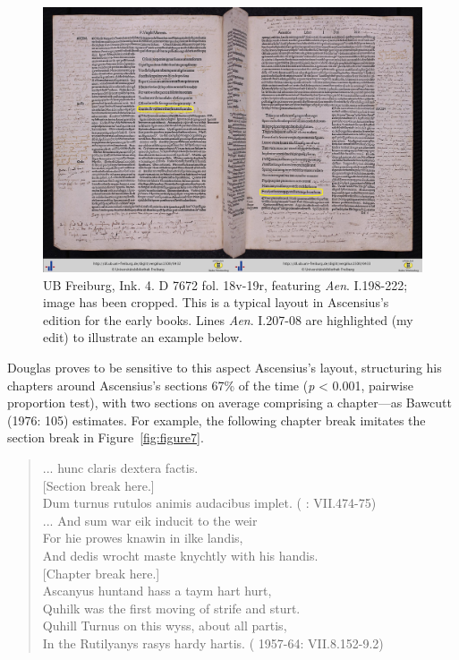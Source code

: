 \documentclass{dhbenelux}
\begin{document}
\begin{figure}[H]
\begin{center}
\includegraphics[width=1\linewidth]{Images/Figure6.jpg}
\end{center}
\caption{UB Freiburg, Ink. 4. D 7672 fol. 18v-19r, featuring \emph{Aen}. I.198-222; image has been cropped.  This is a typical layout in Ascensius’s edition for the early books.  Lines \emph{Aen}. I.207-08 are highlighted (my edit) to illustrate an example below.}
\label{fig:figure6}
\end{figure}

Douglas proves to be sensitive to this aspect Ascensius's layout,
structuring his chapters around Ascensius's sections 67\% of the time
(\emph{p} \textless{} 0.001, pairwise proportion test), with two sections on average comprising a chapter---as
Bawcutt (1976: 105) estimates. For example, the following chapter break
imitates the section break in Figure~\ref{fig:figure7}.

\begin{quote}
... hunc claris dextera factis.\\
{[}Section break here.{]}\\
Dum turnus rutulos animis audacibus implet. (\citeauthor{virgil1501} \citeyear{virgil1501}: VII.474-75)\\

... And sum war eik inducit to the weir\\
For hie prowes knawin in ilke landis,\\
And dedis wrocht maste knychtly with his handis.\\

{[}Chapter break here.{]}\\
Ascanyus huntand hass a taym hart hurt,\\
Quhilk was the first moving of strife and sturt.\\

Quhill Turnus on this wyss, about all partis,\\
In the Rutilyanys rasys hardy hartis. (\citeauthor{douglas1957} 1957-64: VII.8.152-9.2)
\end{quote}
\end{document}
